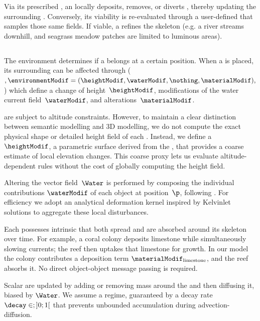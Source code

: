 Via its prescribed , an  locally deposits, removes, or diverts , thereby updating the surrounding . Conversely, its viability is re-evaluated through a user-defined  that samples those same fields. If viable, a  refines the skeleton (e.g. a river streams downhill, and seagrass meadow patches are limited to luminous areas).

\subsection{}

The environment determines if a  belongs at a certain position.
When a  is placed, its surrounding  can be affected through  ($,\environmentModif = (\heightModif, \waterModif, \nothing, \materialModif),$) which define a change of height~$\heightModif$, modifications of the water current field~$\waterModif$, and  alterations~$\materialModif$.

 are subject to altitude constraints.
However, to maintain a clear distinction between semantic modelling and 3D modelling, we do not compute the exact physical shape or detailed height field of each .
Instead, we define a ~$\heightModif$, a parametric surface derived from the , that provides a coarse estimate of local elevation changes. This coarse proxy lets us evaluate altitude-dependent rules without the cost of globally computing the height field.

Altering the vector field~$\Water$ is performed by composing the individual contributions $\waterModif$ of each object at position~$\p$, following \citep{Wejchert1991}. For efficiency we adopt an analytical deformation kernel inspired by Kelvinlet solutions \cite{DeGoes2017} to aggregate these local disturbances.

Each  possesses intrinsic  that both spread and are absorbed around its skeleton over time. For example, a coral colony deposits limestone while simultaneously slowing currents; the reef then uptakes that limestone for growth.
In our model the colony contributes a deposition term $\materialModif_{\text{limestone}}$, and the reef absorbs it. No direct object-object message passing is required.

Scalar  are updated by adding or removing mass around the  and then diffusing it, biased by $\Water$.
We assume a  regime, guaranteed by a decay rate~$\decay \in;]0; 1[$ that prevents unbounded accumulation during advection-diffusion.

